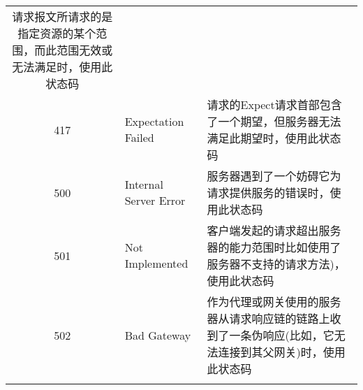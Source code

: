 \begin{longtable}[]{@{}cll@{}}
\begin{minipage}[t]{0.30\columnwidth}
请求报文所请求的是指定资源的某个范围，而此范围无效或无法满足时，使用此状态码\strut
\end{minipage}\tabularnewline
\begin{minipage}[t]{0.32\columnwidth}\centering\strut
417\strut
\end{minipage} & \begin{minipage}[t]{0.30\columnwidth}\raggedright\strut
Expectation Failed\strut
\end{minipage} & \begin{minipage}[t]{0.30\columnwidth}\raggedright\strut
请求的Expect请求首部包含了一个期望，但服务器无法满足此期望时，使用此状态码\strut
\end{minipage}\tabularnewline
\begin{minipage}[t]{0.32\columnwidth}\centering\strut
500\strut
\end{minipage} & \begin{minipage}[t]{0.30\columnwidth}\raggedright\strut
Internal Server Error\strut
\end{minipage} & \begin{minipage}[t]{0.30\columnwidth}\raggedright\strut
服务器遇到了一个妨碍它为请求提供服务的错误时，使用此状态码\strut
\end{minipage}\tabularnewline
\begin{minipage}[t]{0.32\columnwidth}\centering\strut
501\strut
\end{minipage} & \begin{minipage}[t]{0.30\columnwidth}\raggedright\strut
Not Implemented\strut
\end{minipage} & \begin{minipage}[t]{0.30\columnwidth}\raggedright\strut
客户端发起的请求超出服务器的能力范围时比如使用了服务器不支持的请求方法)，使用此状态码\strut
\end{minipage}\tabularnewline
\begin{minipage}[t]{0.32\columnwidth}\centering\strut
502\strut
\end{minipage} & \begin{minipage}[t]{0.30\columnwidth}\raggedright\strut
Bad Gateway\strut
\end{minipage} & \begin{minipage}[t]{0.30\columnwidth}\raggedright\strut
作为代理或网关使用的服务器从请求响应链的链路上收到了一条伪响应(比如，它无法连接到其父网关)时，使用此状态码\strut
\end{minipage}\tabularnewline
\begin{minipage}[t]{0.32\columnwidth}\centering\strut

\end{minipage}
\end{longtable}
